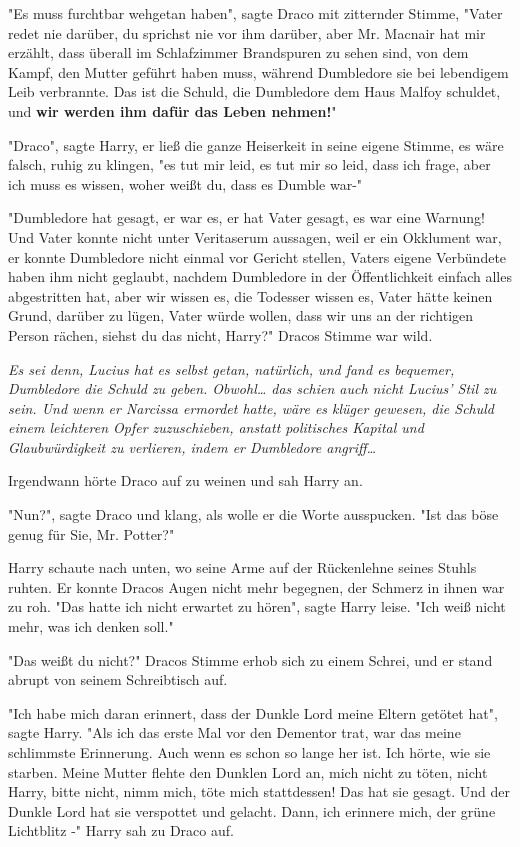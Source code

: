 {"Es muss furchtbar wehgetan haben", sagte Draco mit zitternder Stimme, "Vater redet nie darüber, du sprichst nie vor ihm darüber, aber Mr. Macnair hat mir erzählt, dass überall im Schlafzimmer Brandspuren zu sehen sind, von dem Kampf, den Mutter geführt haben muss, während Dumbledore sie bei lebendigem Leib verbrannte. Das ist die Schuld, die Dumbledore dem Haus Malfoy schuldet, und \textbf{wir werden ihm dafür das Leben nehmen!}"

"Draco", sagte Harry, er ließ die ganze Heiserkeit in seine eigene Stimme, es wäre falsch, ruhig zu klingen, "es tut mir leid, es tut mir so leid, dass ich frage, aber ich muss es wissen, woher weißt du, dass es Dumble war-"

"Dumbledore hat gesagt, er war es, er hat Vater gesagt, es war eine Warnung! Und Vater konnte nicht unter Veritaserum aussagen, weil er ein Okklument war, er konnte Dumbledore nicht einmal vor Gericht stellen, Vaters eigene Verbündete haben ihm nicht geglaubt, nachdem Dumbledore in der Öffentlichkeit einfach alles abgestritten hat, aber wir wissen es, die Todesser wissen es, Vater hätte keinen Grund, darüber zu lügen, Vater würde wollen, dass wir uns an der richtigen Person rächen, siehst du das nicht, Harry?" Dracos Stimme war wild.

\emph{Es sei denn, Lucius hat es selbst getan, natürlich, und fand es bequemer, Dumbledore die Schuld zu geben. Obwohl… das schien auch nicht Lucius' Stil zu sein. Und wenn er Narcissa ermordet hatte, wäre es klüger gewesen, die Schuld einem leichteren Opfer zuzuschieben, anstatt politisches Kapital und Glaubwürdigkeit zu verlieren, indem er Dumbledore angriff…}

Irgendwann hörte Draco auf zu weinen und sah Harry an.

"Nun?", sagte Draco und klang, als wolle er die Worte ausspucken. "Ist das böse genug für Sie, Mr. Potter?"

Harry schaute nach unten, wo seine Arme auf der Rückenlehne seines Stuhls ruhten. Er konnte Dracos Augen nicht mehr begegnen, der Schmerz in ihnen war zu roh. "Das hatte ich nicht erwartet zu hören", sagte Harry leise. "Ich weiß nicht mehr, was ich denken soll."

"Das weißt du nicht?" Dracos Stimme erhob sich zu einem Schrei, und er stand abrupt von seinem Schreibtisch auf.

"Ich habe mich daran erinnert, dass der Dunkle Lord meine Eltern getötet hat", sagte Harry. "Als ich das erste Mal vor den Dementor trat, war das meine schlimmste Erinnerung. Auch wenn es schon so lange her ist. Ich hörte, wie sie starben. Meine Mutter flehte den Dunklen Lord an, mich nicht zu töten, nicht Harry, bitte nicht, nimm mich, töte mich stattdessen! Das hat sie gesagt. Und der Dunkle Lord hat sie verspottet und gelacht. Dann, ich erinnere mich, der grüne Lichtblitz -" Harry sah zu Draco auf.

}
